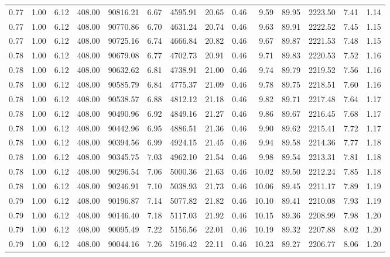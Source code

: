 \begin{table}[!ht]
\begin{tabular}{rrrrrrrrrrrrrr}
0.77 & 1.00 & 6.12 & 408.00 & 90816.21 & 6.67 & 4595.91 & 20.65 & 0.46 & 9.59 & 89.95 & 2223.50 & 7.41 & 1.14 \\
0.77 & 1.00 & 6.12 & 408.00 & 90770.86 & 6.70 & 4631.24 & 20.74 & 0.46 & 9.63 & 89.91 & 2222.52 & 7.45 & 1.15 \\
0.77 & 1.00 & 6.12 & 408.00 & 90725.16 & 6.74 & 4666.84 & 20.82 & 0.46 & 9.67 & 89.87 & 2221.53 & 7.48 & 1.15 \\
0.78 & 1.00 & 6.12 & 408.00 & 90679.08 & 6.77 & 4702.73 & 20.91 & 0.46 & 9.71 & 89.83 & 2220.53 & 7.52 & 1.16 \\
0.78 & 1.00 & 6.12 & 408.00 & 90632.62 & 6.81 & 4738.91 & 21.00 & 0.46 & 9.74 & 89.79 & 2219.52 & 7.56 & 1.16 \\
0.78 & 1.00 & 6.12 & 408.00 & 90585.79 & 6.84 & 4775.37 & 21.09 & 0.46 & 9.78 & 89.75 & 2218.51 & 7.60 & 1.16 \\
0.78 & 1.00 & 6.12 & 408.00 & 90538.57 & 6.88 & 4812.12 & 21.18 & 0.46 & 9.82 & 89.71 & 2217.48 & 7.64 & 1.17 \\
0.78 & 1.00 & 6.12 & 408.00 & 90490.96 & 6.92 & 4849.16 & 21.27 & 0.46 & 9.86 & 89.67 & 2216.45 & 7.68 & 1.17 \\
0.78 & 1.00 & 6.12 & 408.00 & 90442.96 & 6.95 & 4886.51 & 21.36 & 0.46 & 9.90 & 89.62 & 2215.41 & 7.72 & 1.17 \\
0.78 & 1.00 & 6.12 & 408.00 & 90394.56 & 6.99 & 4924.15 & 21.45 & 0.46 & 9.94 & 89.58 & 2214.36 & 7.77 & 1.18 \\
0.78 & 1.00 & 6.12 & 408.00 & 90345.75 & 7.03 & 4962.10 & 21.54 & 0.46 & 9.98 & 89.54 & 2213.31 & 7.81 & 1.18 \\
0.78 & 1.00 & 6.12 & 408.00 & 90296.54 & 7.06 & 5000.36 & 21.63 & 0.46 & 10.02 & 89.50 & 2212.24 & 7.85 & 1.18 \\
0.78 & 1.00 & 6.12 & 408.00 & 90246.91 & 7.10 & 5038.93 & 21.73 & 0.46 & 10.06 & 89.45 & 2211.17 & 7.89 & 1.19 \\
0.79 & 1.00 & 6.12 & 408.00 & 90196.87 & 7.14 & 5077.82 & 21.82 & 0.46 & 10.10 & 89.41 & 2210.08 & 7.93 & 1.19 \\
0.79 & 1.00 & 6.12 & 408.00 & 90146.40 & 7.18 & 5117.03 & 21.92 & 0.46 & 10.15 & 89.36 & 2208.99 & 7.98 & 1.20 \\
0.79 & 1.00 & 6.12 & 408.00 & 90095.49 & 7.22 & 5156.56 & 22.01 & 0.46 & 10.19 & 89.32 & 2207.88 & 8.02 & 1.20 \\
0.79 & 1.00 & 6.12 & 408.00 & 90044.16 & 7.26 & 5196.42 & 22.11 & 0.46 & 10.23 & 89.27 & 2206.77 & 8.06 & 1.20 \\

\end{tabular}
\end{table}
